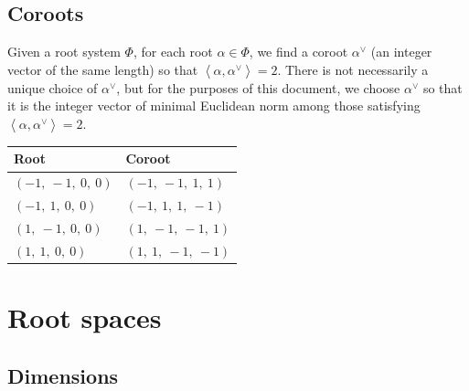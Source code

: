 \documentclass[11pt]{article}
\newcommand{\noi}{\noindent}
\newcommand{\la}{\left\langle}
\newcommand{\ra}{\right\rangle}
\theoremstyle{definition}
\newtheorem{definition}{Definition}[section]
\newif\ifsummablepairs
\begin{document}
\subsection{Coroots}

Given a root system $\Phi$, for each root $\alpha \in \Phi$, we find a coroot $\alpha^\vee$ (an integer vector of the same length) so that $\la \alpha, \alpha^\vee \ra = 2$. There is not necessarily a unique choice of $\alpha^\vee$, but for the purposes of this document, we choose $\alpha^\vee$ so that it is the integer vector of minimal Euclidean norm among those satisfying $\la \alpha, \alpha^\vee \ra = 2$.

\bigskip

\noindent \begin{tabular}{|l|l|}
    \hline
    \textbf{Root} & \textbf{Coroot} \\
    \hline
    $\left( -1, \  -1, \  0, \  0\right)$ & $\left( -1, \  -1, \  1, \  1\right)$ \\
    \hline
    $\left( -1, \  1, \  0, \  0\right)$ & $\left( -1, \  1, \  1, \  -1\right)$ \\
    \hline
    $\left( 1, \  -1, \  0, \  0\right)$ & $\left( 1, \  -1, \  -1, \  1\right)$ \\
    \hline
    $\left( 1, \  1, \  0, \  0\right)$ & $\left( 1, \  1, \  -1, \  -1\right)$ \\
    \hline
\end{tabular}


\ifsummablepairs
\subsection{Linear combinations of roots}

\begin{definition}
For two roots $\alpha, \beta$ in a root system $\Phi$, the set of positive integral linear combinations of $\alpha, \beta$ that are also roots is denoted
\(
	(\alpha, \beta) = \{ i \alpha + j \beta \in \Phi : i, j \in \mathbb{Z}_{\ge 1} \}
\).
\end{definition}
\noi 
\fi

\newpage
\section{Root spaces}

\subsection{Dimensions}
\end{document}
